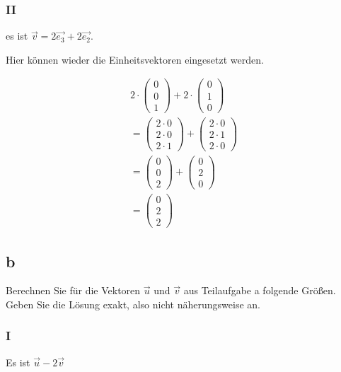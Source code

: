 \subsubsection{II}
es ist $\vec{v} = 2\vec{e_3} + 2\vec{e_2}$.

Hier können wieder die Einheitsvektoren eingesetzt werden.

\begin{align*}
    2 \cdot \begin{pmatrix}
        0 \\ 0 \\ 1
    \end{pmatrix} + 2 \cdot \begin{pmatrix}
        0 \\ 1 \\ 0
    \end{pmatrix} \\
    = \begin{pmatrix}
        2 \cdot 0 \\ 2 \cdot 0 \\ 2 \cdot 1
    \end{pmatrix} + \begin{pmatrix}
        2 \cdot 0 \\ 2 \cdot 1 \\ 2 \cdot 0
    \end{pmatrix} \\
    = \begin{pmatrix}
        0 \\ 0 \\ 2
    \end{pmatrix} + \begin{pmatrix}
        0 \\ 2 \\ 0
    \end{pmatrix} \\
    = \begin{pmatrix}
        0 \\ 2 \\ 2
    \end{pmatrix}
\end{align*}

\subsection{b}
Berechnen Sie für die Vektoren $\vec{u}$ und $\vec{v}$ aus Teilaufgabe a folgende Größen.
Geben Sie die Lösung exakt, also nicht näherungsweise an.

\subsubsection{I}
Es ist $\vec{u} - 2\vec{v}$

